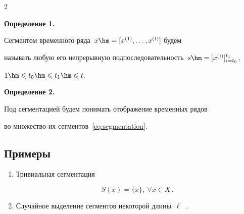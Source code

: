 \begin{multicols}{2}





\noindent


\textbf{Определение 1.}\


Сегментом временн$\acute{\mbox{о}}$го ряда~$x\hm=[x^{(1)},\dots,x^{(t)}]$ будем 


называть любую его непрерывную подпоследовательность~$s\hm=[x^{(i)}]_{i=t_0}^{t_1}$, 


$1\hm\leqslant t_0\hm\leqslant t_1\hm\leqslant t.$





\smallskip





\noindent


\textbf{Определение 2.}\


Под сегментацией будем понимать отображение временн$\acute{\mbox{ы}}$х рядов 


во множество их сегментов~\eqref{eq:segmentation}.








\smallskip





\subsection*{Примеры}





\begin{enumerate}[1.]


\item


  Тривиальная сегментация


  \begin{equation}


  \label{eq:equal_fragmenting}


  S(x)=\{x\},\ \forall x\in X\,.


  \end{equation}





\item


  Случайное выделение сегментов некоторой длины~$\ell$~\cite{geurts2005segment}.






\end{enumerate}
\end{multicols}
